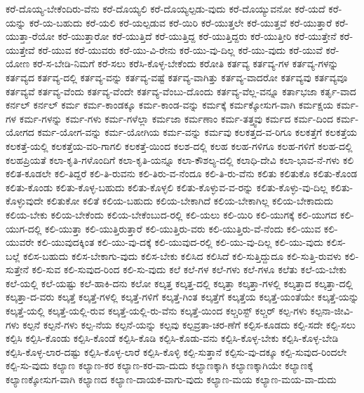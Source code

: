 {ಕರೆ-ದೊಯ್ಯ-ಬೇಕೆಂದಿರು-ವೆನು
ಕರೆ-ದೊಯ್ಯಲಿ
ಕರೆ-ದೊಯ್ಯಲ್ಪಡು-ವುದು
ಕರೆ-ದೊಯ್ಯುವನೋ
ಕರೆ-ಯದೆ
ಕರೆ-ಯನ್ನು
ಕರೆ-ಯ-ಬಹುದು
ಕರೆ-ಯಲಿ
ಕರೆ-ಯಲ್ಪಡುವ
ಕರೆ-ಯಿರಿ
ಕರೆ-ಯುತ್ತಲೇ
ಕರೆ-ಯುತ್ತವೆ
ಕರೆ-ಯುತ್ತಾರೆ
ಕರೆ-ಯುತ್ತಾ-ರೆಯೋ
ಕರೆ-ಯುತ್ತಾರೋ
ಕರೆ-ಯುತ್ತಿದೆ
ಕರೆ-ಯುತ್ತಿದ್ದ
ಕರೆ-ಯುತ್ತಿದ್ದರು
ಕರೆ-ಯುತ್ತೀರಿ
ಕರೆ-ಯುತ್ತೇನೆ
ಕರೆ-ಯುತ್ತೇವೆ
ಕರೆ-ಯುವ
ಕರೆ-ಯುವರು
ಕರೆ-ಯು-ವಿ-ರೇನು
ಕರೆ-ಯು-ವು-ದಿಲ್ಲ
ಕರೆ-ಯು-ವುದು
ಕರೆ-ಯುವೆ
ಕರೆ-ಯೋಣ
ಕರೆ-ಸ-ಬೇಡಿ-ನಿಮಗೆ
ಕರೆ-ಸಲು
ಕರೆಸಿ-ಕೊಳ್ಳ-ಬೇಕೆಂದು
ಕರೋತಿ
ಕರ್ತವ್ಯ
ಕರ್ತವ್ಯ-ಗಳ
ಕರ್ತವ್ಯ-ಗಳನ್ನು
ಕರ್ತವ್ಯದ
ಕರ್ತವ್ಯ-ದಲ್ಲಿ
ಕರ್ತವ್ಯ-ವನ್ನು
ಕರ್ತವ್ಯ-ವಷ್ಟೆ
ಕರ್ತವ್ಯ-ವಾಗಿತ್ತು
ಕರ್ತವ್ಯ-ವಾದರೋ
ಕರ್ತವ್ಯವು
ಕರ್ತವ್ಯವೂ
ಕರ್ತವ್ಯವೆ
ಕರ್ತವ್ಯ-ವೆಂದು
ಕರ್ತವ್ಯ-ವೆಂದೇ
ಕರ್ತವ್ಯ-ವೆಂಬು-ದೊಂದು
ಕರ್ತವ್ಯ-ವೆಲ್ಲ-ವನ್ನೂ
ಕರ್ತಾಭಜಾ
ಕರ್ತೃ-ವಾದ
ಕರ್ನಲ್
ಕರ್ನಲ್‌
ಕರ್ಮ
ಕರ್ಮ-ಕಾಂಡಕ್ಕೂ
ಕರ್ಮ-ಕಾಂಡ-ವನ್ನು
ಕರ್ಮಕ್ಕೆ
ಕರ್ಮಕ್ಕೋಸುಗ-ವಾಗಿ
ಕರ್ಮಕ್ಷಯ
ಕರ್ಮ-ಗಳ
ಕರ್ಮ-ಗಳನ್ನು
ಕರ್ಮ-ಗಳು
ಕರ್ಮ-ಗಳೆಲ್ಲಾ
ಕರ್ಮಜಾ
ಕರ್ಮಣಾಂ
ಕರ್ಮ-ತತ್ತ್ವವು
ಕರ್ಮದ
ಕರ್ಮ-ದಿಂದ
ಕರ್ಮ-ಯೋಗದ
ಕರ್ಮ-ಯೋಗ-ವನ್ನು
ಕರ್ಮ-ಯೋಗಿಯ
ಕರ್ಮ-ವನ್ನು
ಕರ್ಮವು
ಕಲಕತ್ತದ-ವ-ರಿಗೂ
ಕಲಕತ್ತೆಗೆ
ಕಲಕತ್ತೆಯ
ಕಲಕತ್ತೆ-ಯಲ್ಲಿ
ಕಲಕತ್ತೆಯ-ವರಿ-ಗಾಗಲಿ
ಕಲಕತ್ತೆ-ಯಿಂದ
ಕಲಶ-ದಲ್ಲಿ
ಕಲಹ
ಕಲಹ-ಗಳಿಗೂ
ಕಲಹ-ಗಳಿಗೆ
ಕಲಹ-ದಲ್ಲಿ
ಕಲಹಪ್ರಿಯತೆ
ಕಲಾ-ಕೃತಿ-ಗಳೊಂದಿಗೆ
ಕಲಾ-ಕೃತಿ-ಯನ್ನೂ
ಕಲಾ-ಕೌಶಲ್ಯ-ದಲ್ಲಿ
ಕಲಾಧಿ-ದೇವಿ
ಕಲಾ-ಭಾವ-ನೆ-ಗಳು
ಕಲಿ
ಕಲಿತ-ಕೂಡಲೇ
ಕಲಿ-ತಿದ್ದರೆ
ಕಲಿ-ತಿ-ರುವನು
ಕಲಿ-ತಿರು-ವ-ನೆಂದೂ
ಕಲಿ-ತಿ-ರು-ವೆನು
ಕಲಿತು
ಕಲಿತುಕೊ
ಕಲಿತು-ಕೊಂಡ
ಕಲಿತು-ಕೊಂಡು
ಕಲಿತು-ಕೊಳ್ಳ-ಬಹುದು
ಕಲಿತು-ಕೊಳ್ಳಲಿ
ಕಲಿತು-ಕೊಳ್ಳುವ-ವ-ರನ್ನು
ಕಲಿತು-ಕೊಳ್ಳು-ವು-ದಿಲ್ಲ
ಕಲಿತು-ಕೊಳ್ಳುವುದೇ
ಕಲಿತುಕೋ
ಕಲಿತೆ
ಕಲಿಯ-ಬಹುದು
ಕಲಿಯ-ಬೇಕಾಗಿದೆ
ಕಲಿಯ-ಬೇಕಾಗಿಲ್ಲ
ಕಲಿಯ-ಬೇಕಾದುದು
ಕಲಿಯ-ಬೇಕು
ಕಲಿಯ-ಬೇಕೆಂದು
ಕಲಿಯ-ಬೇಕೆಂಬುದ-ರಲ್ಲಿ
ಕಲಿ-ಯಲು
ಕಲಿ-ಯಿರಿ
ಕಲಿ-ಯುಗಕ್ಕೆ
ಕಲಿ-ಯುಗದ
ಕಲಿ-ಯುಗ-ದಲ್ಲಿ
ಕಲಿ-ಯುತ್ತಾ
ಕಲಿ-ಯುತ್ತಿರುತ್ತಾರೆ
ಕಲಿ-ಯುತ್ತಿರು-ವರು
ಕಲಿ-ಯುತ್ತಿರು-ವೆ-ನೆಂದು
ಕಲಿ-ಯುವ
ಕಲಿ-ಯುವರೇ
ಕಲಿ-ಯುವುದಕ್ಕಿಂತ
ಕಲಿ-ಯು-ವು-ದಕ್ಕೆ
ಕಲಿ-ಯುವುದ-ರಲ್ಲಿ
ಕಲಿ-ಯು-ವು-ದಿಲ್ಲ
ಕಲಿ-ಯು-ವುದು
ಕಲಿಸ-ಬಲ್ಲೆ
ಕಲಿಸ-ಬಹುದು
ಕಲಿಸ-ಬೇಕಾಗು-ವುದು
ಕಲಿಸ-ಬೇಕು
ಕಲಿಸಿದ
ಕಲಿಸಿದೆ
ಕಲಿ-ಸುತ್ತಿದ್ದುದೂ
ಕಲಿ-ಸುತ್ತಿ-ರುವಳು
ಕಲಿ-ಸುತ್ತೇನೆ
ಕಲಿ-ಸುವ
ಕಲಿ-ಸುವುದ-ರಿಂದ
ಕಲಿ-ಸು-ವುದು
ಕಲೆ
ಕಲೆ-ಗಳ
ಕಲೆ-ಗಳು
ಕಲೆ-ಗಳೂ
ಕಲೆತು
ಕಲೆ-ಯ-ಬೇಕು
ಕಲೆ-ಯಲ್ಲಿ
ಕಲೆ-ಯಷ್ಟು
ಕಲೆ-ಹಾಕಿ-ದನು
ಕಲೋ
ಕಲ್ಕತ್ತ
ಕಲ್ಕತ್ತ-ದಲ್ಲಿ
ಕಲ್ಕತ್ತಾ
ಕಲ್ಕತ್ತಾ-ಗಳಲ್ಲಿ
ಕಲ್ಕತ್ತಾದ
ಕಲ್ಕತ್ತಾ-ದಲ್ಲಿ
ಕಲ್ಕತ್ತಾ-ದ-ವರು
ಕಲ್ಕತ್ತೆ
ಕಲ್ಕತ್ತೆ-ಗಳಲ್ಲಿ
ಕಲ್ಕತ್ತೆ-ಗಳಿಗೆ
ಕಲ್ಕತ್ತೆ-ಗಿಂತ
ಕಲ್ಕತ್ತೆಗೆ
ಕಲ್ಕತ್ತೆಯ
ಕಲ್ಕತ್ತೆ-ಯಂತೆಯೇ
ಕಲ್ಕತ್ತೆ-ಯನ್ನು
ಕಲ್ಕತ್ತೆ-ಯಲ್ಲಿ
ಕಲ್ಕತ್ತೆ-ಯಲ್ಲಿ-ರುವ
ಕಲ್ಕತ್ತೆ-ಯಲ್ಲಿ-ರು-ವೆನು
ಕಲ್ಕತ್ತೆ-ಯಿಂದ
ಕಲ್ಚರಿಸ್ಟ್
ಕಲ್ಚರ್
ಕಲ್ಪ-ಗಳು
ಕಲ್ಪನಾ-ಜೀವಿ-ಗಳು
ಕಲ್ಪನೆ
ಕಲ್ಪನೆ-ಗಳು
ಕಲ್ಪ-ನೆಯ
ಕಲ್ಪನೆ-ಯನ್ನು
ಕಲ್ಪವು
ಕಲ್ಪವ್ರತಾ-ಚರ-ಣೆಗೆ
ಕಲ್ಪಿಸ-ಕೂಡದು
ಕಲ್ಪಿ-ಸದೇ
ಕಲ್ಪಿ-ಸಲು
ಕಲ್ಪಿಸಿ
ಕಲ್ಪಿಸಿ-ಕೊಂಡು
ಕಲ್ಪಿಸಿ-ಕೊಂಡೆ
ಕಲ್ಪಿಸಿ-ಕೊಡಿ
ಕಲ್ಪಿಸಿ-ಕೊಡು-ವನು
ಕಲ್ಪಿಸಿ-ಕೊಳ್ಳ-ಬೇಕು
ಕಲ್ಪಿಸಿ-ಕೊಳ್ಳ-ಬೇಡಿ
ಕಲ್ಪಿಸಿ-ಕೊಳ್ಳ-ಲಾರ-ದಷ್ಟು
ಕಲ್ಪಿಸಿ-ಕೊಳ್ಳ-ಲಾರೆ
ಕಲ್ಪಿಸಿ-ಕೊಳ್ಳಿ
ಕಲ್ಪಿ-ಸುತ್ತಾನೆ
ಕಲ್ಪಿಸು-ವು-ದಕ್ಕೂ
ಕಲ್ಪಿ-ಸುವುದ-ರಿಂದಲೇ
ಕಲ್ಪಿ-ಸು-ವುದು
ಕಲ್ಯಾಣ
ಕಲ್ಯಾಣ-ಕರ
ಕಲ್ಯಾಣ-ಕರ-ವಾ-ದುದು
ಕಲ್ಯಾಣಕ್ಕಾಗಿ
ಕಲ್ಯಾಣಕ್ಕಾಗಿಯೇ
ಕಲ್ಯಾಣಕ್ಕೆ
ಕಲ್ಯಾಣಕ್ಕೋಸುಗ-ವಾಗಿ
ಕಲ್ಯಾಣದ
ಕಲ್ಯಾಣ-ದಾಯಕ-ವಾಗು-ವುದು
ಕಲ್ಯಾಣ-ಮಯ
ಕಲ್ಯಾಣ-ಮಯ-ವಾ-ದುದು
}
